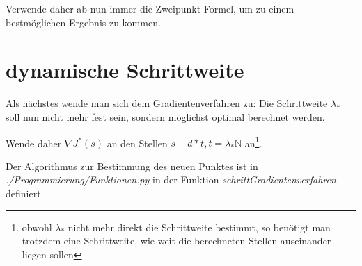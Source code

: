 \documentclass[a4paper,12pt]{report}
\newcommand{\N}{\mathbb N}
\newcommand{\1}{\mathds{1}}
\theoremstyle{plain} %
\theoremstyle{definition} %
\theoremstyle{remark}
\begin{document}
            Verwende daher ab nun immer die Zweipunkt-Formel, um zu einem bestmöglichen Ergebnis zu kommen.

      \section{dynamische Schrittweite}
            Als nächstes wende man sich dem Gradientenverfahren zu:
            Die Schrittweite $\lambda_*$ soll nun nicht mehr fest sein, sondern möglichst optimal berechnet werden.

            Wende daher $\nabla J^*(s)$ an den Stellen $s-d*t, t=\lambda_*\N$ an\footnote{obwohl $\lambda_*$ nicht mehr direkt die Schrittweite bestimmt, so benötigt man trotzdem eine Schrittweite, wie weit die berechneten Stellen auseinander liegen sollen}.

            Der Algorithmus zur Bestimmung des neuen Punktes ist in \textit{./Programmierung/Funktionen.py} in der Funktion \textit{schrittGradientenverfahren} definiert.

\end{document}
